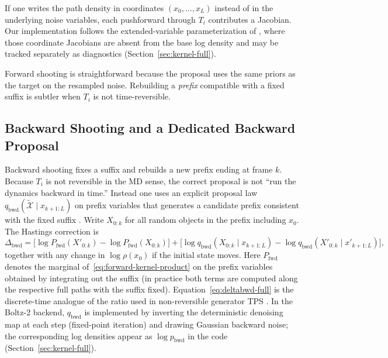 \begin{remark}
If one writes the path density in coordinates $(x_0,\ldots,x_L)$ instead of in the underlying noise variables, each pushforward through $T_i$ contributes a Jacobian. Our implementation follows the extended-variable parameterization of \citet{falkner2023}, where those coordinate Jacobians are absent from the base log density and may be tracked separately as diagnostics (Section~\ref{sec:kernel-full}).
\end{remark}

Forward shooting is straightforward because the proposal uses the same priors
as the target on the resampled noise. Rebuilding a \emph{prefix} compatible with
a fixed suffix is subtler when $T_i$ is not time-reversible.

\subsection{Backward Shooting and a Dedicated Backward Proposal}

Backward shooting fixes a suffix and rebuilds a new prefix ending at frame $k$. Because $T_i$ is not reversible in the MD sense, the correct proposal is not ``run the dynamics backward in time.'' Instead one uses an explicit proposal law $q_{\mathrm{bwd}}(\tilde{\mathcal{X}} \mid x_{k+1:L})$ on prefix variables that generates a candidate prefix consistent with the fixed suffix \citep{buijsman2020,falkner2024}. Write $X_{0:k}$ for all random objects in the prefix including $x_0$. The Hastings correction is
\begin{equation}
  \label{eq:deltabwd-full}
  \Delta_{\mathrm{bwd}}
  = \bigl[\log P_{\mathrm{fwd}}(X'_{0:k}) - \log P_{\mathrm{fwd}}(X_{0:k})\bigr]
  + \bigl[\log q_{\mathrm{bwd}}(X_{0:k} \mid x_{k+1:L})
          - \log q_{\mathrm{bwd}}(X'_{0:k} \mid x'_{k+1:L})\bigr],
\end{equation}
together with any change in $\log \rho(x_0)$ if the initial state moves. Here $P_{\mathrm{fwd}}$ denotes the marginal of~\eqref{eq:forward-kernel-product} on the prefix variables obtained by integrating out the suffix (in practice both terms are computed along the respective full paths with the suffix fixed). Equation~\eqref{eq:deltabwd-full} is the discrete-time analogue of the ratio used in non-reversible generator TPS \citep{falkner2024}. In the Boltz-2 backend, $q_{\mathrm{bwd}}$ is implemented by inverting the deterministic denoising map at each step (fixed-point iteration) and drawing Gaussian backward noise; the corresponding log densities appear as $\log p_{\mathrm{bwd}}$ in the code (Section~\ref{sec:kernel-full}).


